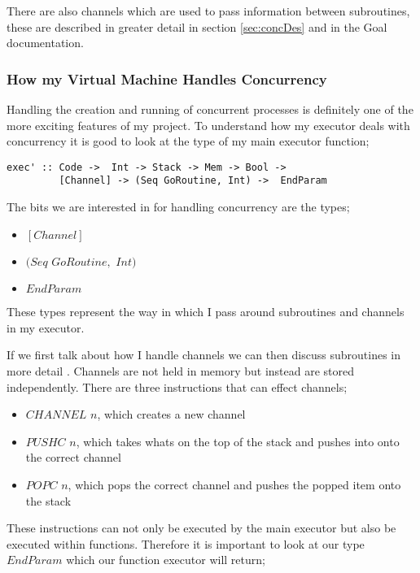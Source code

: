 There are also channels which are used to pass information between subroutines, these are described in greater detail in section \ref{sec:concDes} and in the Goal documentation.   

\subsubsection{How my Virtual Machine Handles Concurrency}

Handling the creation and running of concurrent processes is definitely one of the more exciting features of my project. To understand how my executor deals with concurrency it is good to look at the type of my main executor function;

\begin{lstlisting}
exec' :: Code ->  Int -> Stack -> Mem -> Bool -> 
         [Channel] -> (Seq GoRoutine, Int) ->  EndParam
\end{lstlisting}

The bits we are interested in for handling concurrency are the types;

\begin{itemize}
\item $[Channel]$
\item $(Seq$ $GoRoutine,$ $Int)$  
\item $EndParam$
\end{itemize} 

These types represent the way in which I pass around subroutines and channels in my executor. 

If we first talk about how I handle channels we can then discuss subroutines in more detail . Channels are not held in memory but instead are stored independently. There are three instructions that can effect channels;

\begin{itemize}
\item $CHANNEL$ $n$, which creates a new channel
\item $PUSHC$ $n$, which takes whats on the top of the stack and pushes into onto the correct channel 
\item $POPC$ $n$, which pops the correct channel and pushes the popped item onto the stack
\end{itemize} 

These instructions can not only be executed by the main executor but also be executed within functions. Therefore it is important to look at our type $EndParam$ which our function executor will return;

